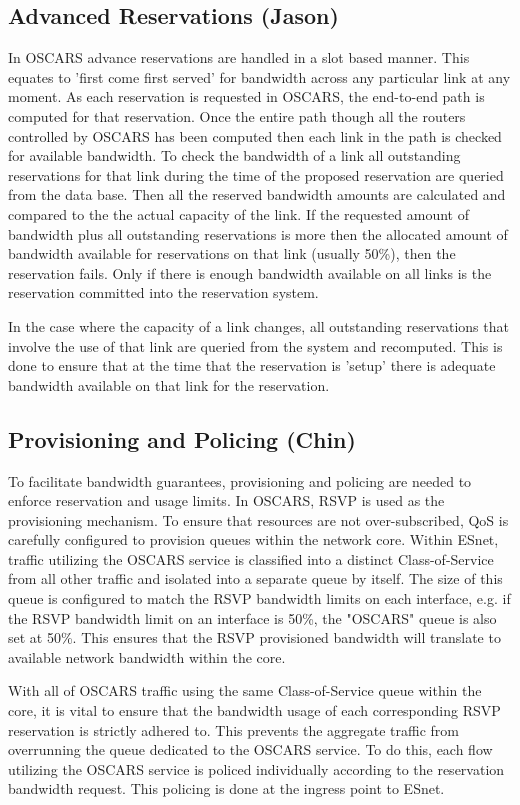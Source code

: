 \documentclass[conference]{IEEEtran}
\begin{document}
\subsection{Advanced Reservations (Jason)}
In OSCARS advance reservations are handled in a slot based manner. This equates
to 'first come first served' for bandwidth across any particular link at any
moment. As each reservation is requested in OSCARS, the end-to-end path is
computed for that reservation. Once the entire path though all the routers
controlled by OSCARS has been computed then each link in the path is checked for
available bandwidth. To check the bandwidth of a link all outstanding
reservations for that link during the time of the proposed reservation are
queried from the data base. Then all the reserved bandwidth amounts are
calculated and compared to the the actual capacity of the link. If the requested
amount of bandwidth plus all outstanding reservations is more then the allocated
amount of bandwidth available for reservations on that link (usually
50\%), then the reservation fails. Only if there is enough bandwidth 
available on all links is the reservation committed into the reservation system.

In the case where the capacity of a link changes, all outstanding reservations
that involve the use of that link are queried from the system and recomputed.
This is done to ensure that at the time that the reservation is 'setup' there
is adequate bandwidth available on that link for the reservation.

\subsection{Provisioning and Policing (Chin)}
To facilitate bandwidth guarantees, provisioning and policing are needed to 
enforce reservation and usage limits.  In OSCARS, RSVP is used as the 
provisioning mechanism.  To ensure that resources are not over-subscribed, QoS 
is carefully configured to provision queues within the network core.  Within 
ESnet, traffic utilizing the OSCARS service is classified into a distinct 
Class-of-Service from all other traffic and isolated into a separate queue by 
itself.  The size of this queue is configured to match the RSVP bandwidth 
limits on each interface, e.g. if the RSVP bandwidth limit on an interface is 
50\%, the "OSCARS" queue is also set at 50\%.  This ensures that the RSVP 
provisioned bandwidth will translate to available network bandwidth within 
the core.

With all of OSCARS traffic using the same Class-of-Service queue within the 
core, it is vital to ensure that the bandwidth usage of each corresponding 
RSVP reservation is strictly adhered to.  This prevents the aggregate traffic 
from overrunning the queue dedicated to the OSCARS service.  To do this, each 
flow utilizing the OSCARS service is policed individually according to the 
reservation bandwidth request.  This policing is done at the ingress point to 
ESnet.
\end{document}
